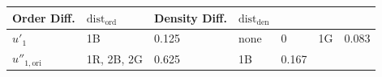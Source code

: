 \begin{longtable}[]{@{}lllllll@{}}
\begin{minipage}[b]{0.06\columnwidth}
Order Diff.\strut
\end{minipage} & \begin{minipage}[b]{0.15\columnwidth}\raggedright
\(\text{dist}_{\text{ord}}\)\strut
\end{minipage} & \begin{minipage}[b]{0.07\columnwidth}\raggedright
Density Diff.\strut
\end{minipage} & \begin{minipage}[b]{0.15\columnwidth}\raggedright
\(\text{dist}_{\text{den}}\)\strut
\end{minipage}\tabularnewline
\midrule
\endhead
\begin{minipage}[t]{0.13\columnwidth}\raggedright
\(u'_1\)\strut
\end{minipage} & \begin{minipage}[t]{0.10\columnwidth}\raggedright
1B\strut
\end{minipage} & \begin{minipage}[t]{0.15\columnwidth}\raggedright
0.125\strut
\end{minipage} & \begin{minipage}[t]{0.06\columnwidth}\raggedright
none\strut
\end{minipage} & \begin{minipage}[t]{0.15\columnwidth}\raggedright
0\strut
\end{minipage} & \begin{minipage}[t]{0.07\columnwidth}\raggedright
1G\strut
\end{minipage} & \begin{minipage}[t]{0.15\columnwidth}\raggedright
0.083\strut
\end{minipage}\tabularnewline
\begin{minipage}[t]{0.13\columnwidth}\raggedright
\(u''_{1,\text{ori}}\)\strut
\end{minipage} & \begin{minipage}[t]{0.10\columnwidth}\raggedright
1R, 2B, 2G\strut
\end{minipage} & \begin{minipage}[t]{0.15\columnwidth}\raggedright
0.625\strut
\end{minipage} & \begin{minipage}[t]{0.06\columnwidth}\raggedright
1B\strut
\end{minipage} & \begin{minipage}[t]{0.15\columnwidth}\raggedright
0.167\strut
\end{minipage} & \begin{minipage}[t]{0.07\columnwidth}\raggedright

\end{minipage}
\end{longtable}
